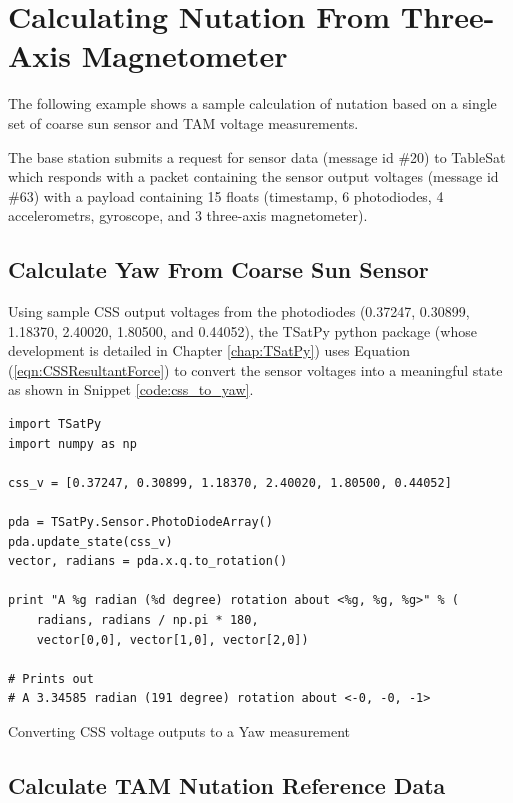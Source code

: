 \section{Calculating Nutation From Three-Axis Magnetometer}

The following example shows a sample calculation of nutation based on a single set of coarse sun sensor and TAM voltage measurements.

The base station submits a request for sensor data (message id \#20) to TableSat which responds with a packet containing the sensor output voltages (message id \#63) with a payload containing 15 floats (timestamp, 6 photodiodes, 4 accelerometrs, gyroscope, and 3 three-axis magnetometer).

\subsection{Calculate Yaw From Coarse Sun Sensor}

Using sample CSS output voltages from the photodiodes (0.37247, 0.30899, 1.18370, 2.40020, 1.80500, and 0.44052), the TSatPy python package (whose development is detailed in Chapter \ref{chap:TSatPy}) uses Equation (\ref{eqn:CSSResultantForce}) to convert the sensor voltages into a meaningful state as shown in Snippet \ref{code:css_to_yaw}.

\begin{listing}[H]
\begin{singlespace}
  \begin{verbatim}
import TSatPy
import numpy as np

css_v = [0.37247, 0.30899, 1.18370, 2.40020, 1.80500, 0.44052]

pda = TSatPy.Sensor.PhotoDiodeArray()
pda.update_state(css_v)
vector, radians = pda.x.q.to_rotation()

print "A %g radian (%d degree) rotation about <%g, %g, %g>" % (
    radians, radians / np.pi * 180,
    vector[0,0], vector[1,0], vector[2,0])

# Prints out
# A 3.34585 radian (191 degree) rotation about <-0, -0, -1>
  \end{verbatim}
\caption{Converting CSS voltage outputs to a Yaw measurement}
\label{code:css_to_yaw}
\nocite{minted}
\end{singlespace}
\end{listing}

\subsection{Calculate TAM Nutation Reference Data}
\label{subsec:CalculateTAMNutationReferenceData}

